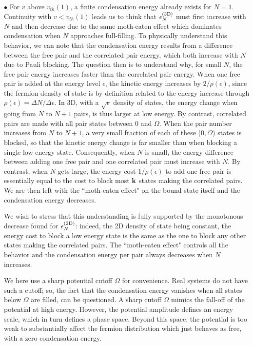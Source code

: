 \documentclass[5p,twocolumn]{elsarticle}
\begin{document}
$\bullet$  For $v$ above $v_{th}(1)$, a finite condensation energy already exists for $N=1$. Continuity with $v<v_{th}(1)$ leads us to think that $\epsilon^{{\text{(3D)}}}_N$ must first increase with $N$ and then decrease due to the same moth-eaten effect which dominates condensation when $N$ approaches full-filling. 
To physically understand this behavior, we can note that the condensation energy results from a difference between the free pair and the correlated pair energy, which both increase with $N$ due to Pauli blocking.  The question then is to understand why, for small $N$, the free pair energy increases faster than the correlated pair energy. When one free pair is added at the energy level $\epsilon$, the kinetic energy increases by $2/\rho(\epsilon)$, since the fermion density of state is by definition related to the energy increase through $\rho(\epsilon)=\Delta{}N/\Delta\epsilon$.  In 3D, with a $\sqrt{\epsilon}$ density of states, the energy change when going from $N$ to $N+1$ pairs, is thus larger at low energy. By contrast, correlated pairs are made with all pair states between $0$ and $\Omega$. When the pair number increases from $N$ to $N+1$, a very small fraction of each of these ($0,\Omega$) states is blocked, so that the kinetic energy change is far smaller than when blocking a single low energy state.  Consequently, when $N$ is small,  the energy difference between adding one free pair and one correlated pair must increase with $N$. By contrast, when $N$ gets large, the energy cost $1/\rho(\epsilon)$ to add one free pair is essentially equal to the cost to block most $\mathbf{k}$ states making the correlated pairs.  We are then left with the ``moth-eaten effect" on the bound state itself and the condensation energy decreases. 

We wish to stress that this understanding is fully supported by the monotonous decrease  found for $\epsilon^{{\text{(2D)}}}_N$: indeed, the 2D density of state being constant, the energy cost to block a low energy state is the same as the one to block  any other states making the correlated pairs. The ``moth-eaten effect" controls all the behavior and the condensation energy per pair always decreases when $N$ increases.

We here use a sharp potential cutoff $\Omega$ for convenience.  Real systems do not have such a cutoff; so,   the fact that the condensation energy vanishes when all states below $\Omega$ are filled, can be questioned.  A sharp cutoff $\Omega$ mimics the fall-off of the potential at high energy.  However, the potential amplitude defines an energy scale, which in turn defines a phase space.  Beyond this space, the potential is too weak to substantially affect the fermion distribution which just behaves as free, with a zero condensation energy. 
\end{document}
